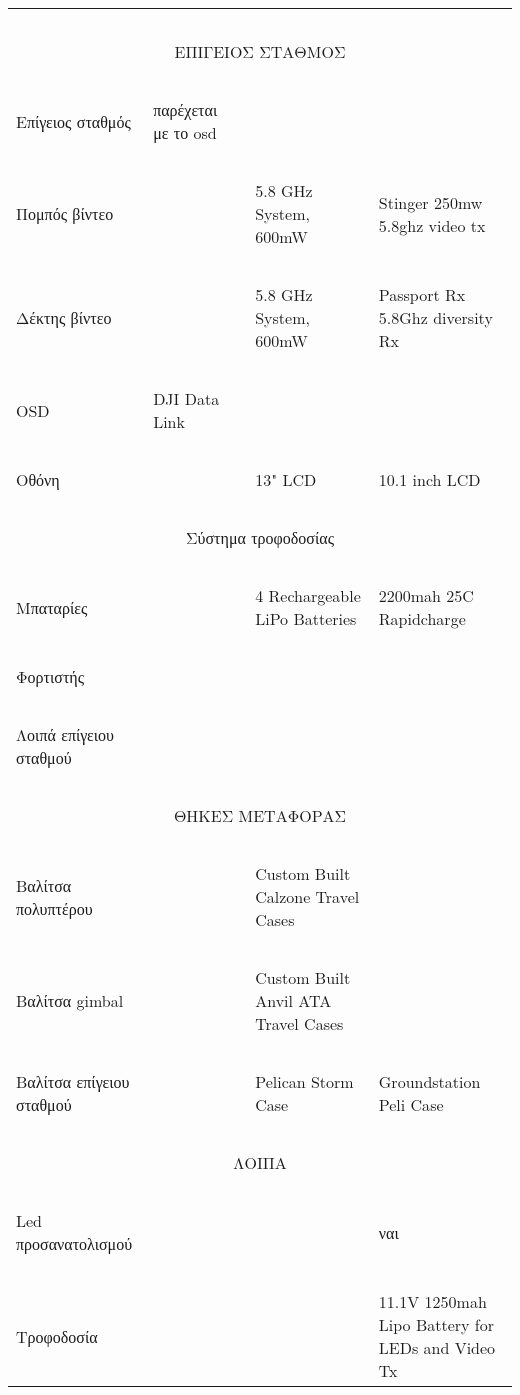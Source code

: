 \documentclass[a4paper, 12pt, twoside]{report}
\begin{document}
\begin{landscape}
\begin{longtable}{ m{3cm} m{2.2cm} m{2.2cm} m{2.2cm} m{2.2cm} }
				\hdashline
				~\\
				\multicolumn{5}{c}{ΕΠΙΓΕΙΟΣ ΣΤΑΘΜΟΣ}\\
				\hline
				~\\
				Επίγειος σταθμός & παρέχεται με το osd & & & \\
				\hdashline
				~\\
				Πομπός βίντεο & & & 5.8 GHz System, 600mW & Stinger 250mw
5.8ghz video tx\\
				\hdashline
				~\\
				Δέκτης βίντεο & & & 5.8 GHz System, 600mW & Passport Rx
5.8Ghz diversity Rx\\
				\hdashline
				~\\
				OSD & DJI Data Link & & & \\
				\hdashline
				~\\
				Οθόνη & & & 13" LCD & 10.1 inch LCD\\
				\hdashline
				~\\
				\multicolumn{5}{c}{Σύστημα τροφοδοσίας}\\
				\hdashline
				~\\
				Μπαταρίες & & & 4 Rechargeable LiPo Batteries & 2200mah 25C Rapidcharge\\
				\hdashline
				~\\
				Φορτιστής & & & & \\
				\hdashline
				~\\
				Λοιπά επίγειου σταθμού & & & & \\
				\hdashline\
				~\\
				\multicolumn{5}{c}{ΘΗΚΕΣ ΜΕΤΑΦΟΡΑΣ}\\
				\hline
				~\\
				Βαλίτσα πολυπτέρου & & & Custom Built Calzone Travel Cases & \\
				\hdashline
				~\\
				Βαλίτσα gimbal & & & Custom Built Anvil ATA Travel Cases & \\
				\hdashline
				~\\
				Βαλίτσα επίγειου σταθμού & & & Pelican Storm Case & Groundstation Peli Case\\
				\hdashline
				~\\
				\multicolumn{5}{c}{ΛΟΙΠΑ}\\
				\hline
				~\\
				Led προσανατολισμού & & & & ναι\\
				\hdashline
				~\\
				Τροφοδοσία & & & & 11.1V 1250mah Lipo Battery for LEDs and Video Tx\\ 

\end{longtable}
\end{landscape}
\end{document}
